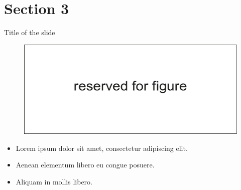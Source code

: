 \documentclass[russian,12pt,aspectratio=169,xcolor=table]{beamer}
\begin{document}
\section{Section 3}

\begin{frame}{Title of the slide}
  \begin{figure}
    \centering
    \includegraphics[scale=0.56]{img/7}
  \end{figure}
  \begin{itemize}
  \item Lorem ipsum dolor sit amet, consectetur adipiscing elit. 
  \item Aenean elementum libero eu congue posuere.
  \item Aliquam in mollis libero. 
  \end{itemize}
\end{frame}
\end{document}
